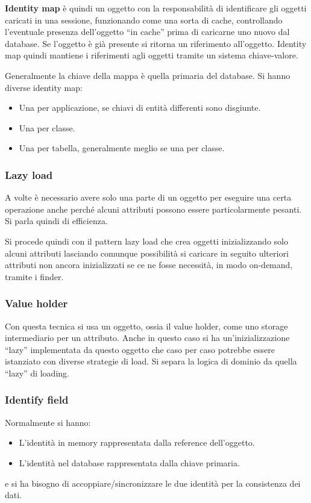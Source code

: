 \textbf{Identity map} è quindi un oggetto con la responsabilità di identificare
gli oggetti caricati in una sessione, funzionando come una sorta di cache,
controllando l'eventuale presenza dell'oggetto “in cache” prima di caricarne uno
nuovo dal database. Se l'oggetto è già presente si ritorna un riferimento
all'oggetto. Identity map quindi mantiene i riferimenti agli oggetti tramite un
sistema chiave-valore.

Generalmente la chiave della mappa è quella primaria del database. Si hanno
diverse identity map:
\begin{itemize}
      \item Una per applicazione, se chiavi di entità differenti sono disgiunte.
      \item Una per classe.
      \item Una per tabella, generalmente meglio se una per classe.
\end{itemize}
\subsubsection{Lazy load}
A volte è necessario avere solo una parte di un oggetto per eseguire una certa
operazione anche perché alcuni attributi possono essere particolarmente pesanti.
Si parla quindi di efficienza.

Si procede quindi con il pattern lazy load che crea oggetti inizializzando solo
alcuni attributi lasciando comunque possibilità si caricare in seguito ulteriori
attributi non ancora inizializzati se ce ne fosse necessità, in modo on-demand,
tramite i finder.
\subsubsection{Value holder}
Con questa tecnica si usa un oggetto, ossia il value holder, come uno storage
intermediario per un attributo. Anche in questo caso si ha un'inizializzazione
“lazy” implementata da questo oggetto che caso per caso potrebbe essere istanziato
con diverse strategie di load. Si separa la logica di dominio da quella “lazy”
di loading.
\subsubsection{Identify field}
Normalmente si hanno:
\begin{itemize}
      \item L'identità in memory rappresentata dalla reference dell'oggetto.
      \item L'identità nel database rappresentata dalla chiave primaria.
\end{itemize}
e si ha bisogno di accoppiare/sincronizzare le due identità per la consistenza
dei dati.

